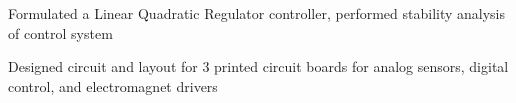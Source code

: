 \documentclass[letterpaper]{deedy-resume} %
\begin{document}
\begin{minipage}[t]{1\textwidth}
\begin{tightitemize}
\item Formulated a Linear Quadratic Regulator controller, performed stability analysis of control system

\item Designed circuit and layout for 3 printed circuit boards for analog sensors, digital control, and electromagnet drivers

\end{tightitemize}

\sectionspace %


\end{minipage} %


\newpage %
\end{document}

